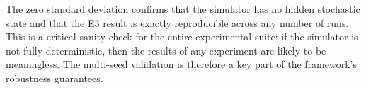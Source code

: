 The zero standard deviation confirms that the simulator has no hidden
stochastic state and that the E3 result is exactly reproducible across
any number of runs. This is a critical sanity check for the entire experimental suite:
if the simulator is not fully deterministic, then the results of any
experiment are likely to be meaningless.  The multi-seed 
validation is therefore a key part of the framework's robustness guarantees.
